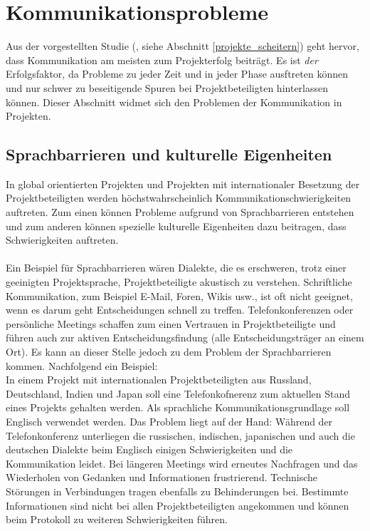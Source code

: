 \documentclass[12pt]{scrartcl}
\begin{document}
\pagebreak
\section{Kommunikationsprobleme}
\label{kommunikationsprobleme}

Aus der vorgestellten Studie (\cite{GPM_Studie_2008}, siehe Abschnitt \ref{projekte_scheitern}) geht hervor, dass Kommunikation am meisten zum Projekterfolg beiträgt. Es ist \textit{der} Erfolgsfaktor, da Probleme zu jeder Zeit und in jeder Phase ausftreten können und nur schwer zu beseitigende Spuren bei Projektbeteiligten hinterlassen können. Dieser Abschnitt widmet sich den Problemen der Kommunikation in Projekten.

\subsection{Sprachbarrieren und kulturelle Eigenheiten}
In global orientierten Projekten und Projekten mit internationaler Besetzung der Projektbeteiligten werden höchstwahrscheinlich Kommunikationschwierigkeiten auftreten. Zum einen können Probleme aufgrund von Sprachbarrieren entstehen und zum anderen können spezielle kulturelle Eigenheiten dazu beitragen, dass Schwierigkeiten auftreten. \\
\\
Ein Beispiel für Sprachbarrieren wären Dialekte, die es erschweren, trotz einer geeinigten Projektsprache, Projektbeteiligte akustisch zu verstehen. Schriftliche Kommunikation, zum Beispiel E-Mail, Foren, Wikis usw., ist oft nicht geeignet, wenn es darum geht Entscheidungen schnell zu treffen. Telefonkonferenzen oder persönliche Meetings schaffen zum einen Vertrauen in Projektbeteiligte und führen auch zur aktiven Entscheidungsfindung (alle Entscheidungsträger an einem Ort). Es kann an dieser Stelle jedoch zu dem Problem der Sprachbarrieren kommen. Nachfolgend ein Beispiel: \\
In einem Projekt mit internationalen Projektbeteiligten aus Russland, Deutschland, Indien und Japan soll eine Telefonkofnerenz zum aktuellen Stand eines Projekts gehalten werden. Als sprachliche Kommunikationsgrundlage soll Englisch verwendet werden. Das Problem liegt auf der Hand: Während der Telefonkonferenz unterliegen die russischen, indischen, japanischen und auch die deutschen Dialekte beim Englisch einigen Schwierigkeiten und die Kommunikation leidet. Bei längeren Meetings wird erneutes Nachfragen und das Wiederholen von Gedanken und Informationen frustrierend. Technische Störungen in Verbindungen tragen ebenfalls zu Behinderungen bei. Bestimmte Informationen sind nicht bei allen Projektbeteiligten angekommen und können beim Protokoll zu weiteren Schwierigkeiten führen. \\
\end{document}
